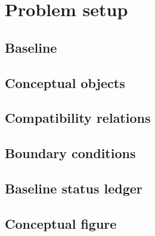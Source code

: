 \section{Problem setup}\label{sec:problem-setup}


\subsection{Baseline}\label{subsec:baseline}


\subsection{Conceptual objects}\label{subsec:conceptual-objects}


\subsection{Compatibility relations}\label{subsec:compatibility}


\subsection{Boundary conditions}\label{subsec:boundary-conditions}


\subsection{Baseline status ledger}\label{subsec:baseline-status}


\subsection{Conceptual figure}\label{subsec:conceptual-figure}

% 
